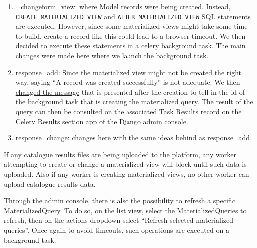\documentclass[
]{book}
\providecommand{\tightlist}{%
  \setlength{\itemsep}{0pt}\setlength{\parskip}{0pt}}
\begin{document}
\begin{enumerate}
\def\labelenumi{\arabic{enumi}.}
\tightlist
\item
  \href{https://github.com/django/django/blob/3.2.5/django/contrib/admin/options.py\#L1542}{\_changeform\_view}: where Model records were being created.
  Instead, \texttt{CREATE\ MATERIALIZED\ VIEW} and \texttt{ALTER\ MATERIALIZED\ VIEW} SQL statements are executed.
  However, since some materialized views might take some time to build, create a record like this could lead to a browser timeout.
  We then decided to execute these statements in a celery background task.
  The main changes were made \href{https://github.com/EHDEN/NetworkDashboards/blob/master/dashboard_viewer/materialized_queries_manager/admin.py\#L87-L92}{here} where we launch the background task.
\item
  \href{https://github.com/django/django/blob/3.2.5/django/contrib/admin/options.py\#L1176}{response\_add}: Since the materialized view might not be created the right way, saying ``A record was created successfully'' is not adequate.
  We then \href{https://github.com/EHDEN/NetworkDashboards/blob/master/dashboard_viewer/materialized_queries_manager/admin.py\#L177-L183}{changed the message} that is presented after the creation to tell in the id of the background task that is creating the materialized query.
  The result of the query can then be consulted on the associated Task Results record on the Celery Results section app of the Django admin console.
\item
  \href{https://github.com/django/django/blob/3.2.5/django/contrib/admin/options.py\#L1253}{response\_change}: changes \href{https://github.com/EHDEN/NetworkDashboards/blob/master/dashboard_viewer/materialized_queries_manager/admin.py\#L213-L219}{here} with the same ideas behind as response\_add.
\end{enumerate}

If any catalogue results files are being uploaded to the platform, any worker attempting to create or change a materialized view will block until such data is uploaded.
Also if any worker is creating materialized views, no other worker can upload catalogue results data.

Through the admin console, there is also the possibility to refresh a specific MaterializedQuery.
To do so, on the list view, select the MaterializedQueries to refresh, then on the actions dropdown select ``Refresh selected materialized queries''.
Once again to avoid timeouts, such operations are executed on a background task.
\end{document}
